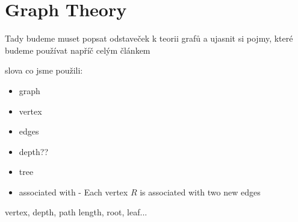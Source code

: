\section{Graph Theory}
\label{sec:graph_theory}
Tady budeme muset popsat odstaveček k teorii grafů a ujasnit si pojmy, které budeme používat napříč celým článkem

slova co jsme použili:

\begin{itemize}
    \item graph
    \item vertex
    \item edges
    \item depth??
    \item tree
    \item associated with - Each vertex \(R\) is associated with two new edges
\end{itemize}

vertex, depth, path length, root, leaf...